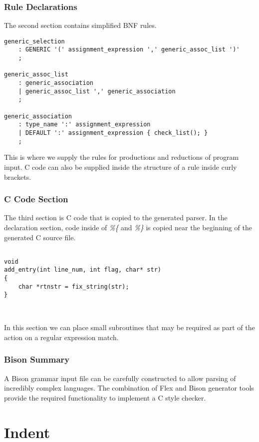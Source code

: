 \subsubsection{Rule Declarations} 
\noindent The second section contains simplified BNF rules.
\begingroup
\begin{verbatim}
generic_selection
    : GENERIC '(' assignment_expression ',' generic_assoc_list ')'
    ;

generic_assoc_list
    : generic_association
    | generic_assoc_list ',' generic_association
    ;

generic_association
    : type_name ':' assignment_expression
    | DEFAULT ':' assignment_expression { check_list(); }
    ;
\end{verbatim}
\endgroup
\noindent This is where we supply the rules for productions and reductions of 
program input. C code can also be supplied inside the structure of a rule 
inside curly brackets.

\subsubsection{C Code Section}
\noindent The third section is C code that is copied to the generated parser.
In the declaration section, code inside of \emph{\%\{} and \emph{\%\}} is 
copied near the beginning of the generated C source file. 
\begingroup
\begin{verbatim}

void
add_entry(int line_num, int flag, char* str)
{
    char *rtnstr = fix_string(str);
}



\end{verbatim}
\endgroup
\noindent In this section we can place small subroutines that may be required
as part of the action on a regular expression match.\\

\subsubsection{Bison Summary}
A Bison grammar input file can be carefully constructed to allow parsing of 
incredibly complex languages. The combination of Flex and Bison generator tools
provide the required functionality to implement a C style checker. 


\section{Indent}

